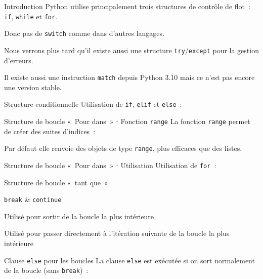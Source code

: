 \begin{frame}{Introduction}
  Python utilise principalement trois structures de contrôle de flot~: \texttt{if}, \texttt{while} et \texttt{for}.

  Donc pas de \texttt{switch} comme dans d'autres langages.

  Nous  verrons plus tard qu'il existe aussi une structure \texttt{try}/\texttt{except} pour la gestion d'erreurs.

  Il existe aussi une instruction \texttt{match} depuis Python 3.10 mais ce n'est pas encore une version stable.
\end{frame}

\begin{frame}{Structure conditionnelle}
  Utilisation de \texttt{if}, \texttt{elif} et \texttt{else}~:
\end{frame}

\begin{frame}{Structure de boucle «~Pour dans~» ⋅ Fonction \texttt{range}}
  La fonction \texttt{range} permet de créer des suites d'indices~:


  Par défaut elle renvoie des objets de type \texttt{range}, plus efficaces que des listes.
\end{frame}

\begin{frame}{Structure de boucle «~Pour dans~» ⋅ Utilisation}
  Utilisation de \texttt{for}~:
\end{frame}

\begin{frame}{Structure de boucle «~tant que~»}
\end{frame}

\begin{frame}{\texttt{break} \& \texttt{continue}}
  \begin{description}[<+->]
    \item[\texttt{break}] Utilisé pour sortir de la boucle la plus intérieure
    \item[\texttt{continue}] Utilisé pour passer directement à l'itération suivante de la boucle la plus intérieure
  \end{description}

\end{frame}

\begin{frame}{Clause \texttt{else} pour les boucles}
  La clause \texttt{else} est exécutée si on sort normalement de la boucle (sans \texttt{break})~:

\end{frame}
